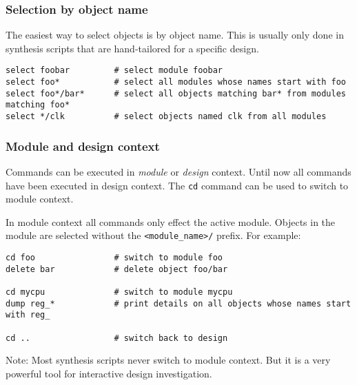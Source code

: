 \subsubsection{Selection by object name}

\begin{frame}[fragile]{\subsubsecname}
The easiest way to select objects is by object name. This is usually only done
in synthesis scripts that are hand-tailored for a specific design.

\bigskip
\begin{lstlisting}[xleftmargin=0.5cm, basicstyle=\ttfamily\fontsize{8pt}{10pt}\selectfont, language=ys]
select foobar         # select module foobar
select foo*           # select all modules whose names start with foo
select foo*/bar*      # select all objects matching bar* from modules matching foo*
select */clk          # select objects named clk from all modules
\end{lstlisting}
\end{frame}

\subsubsection{Module and design context}

\begin{frame}[fragile]{\subsubsecname}
Commands can be executed in {\it module\/} or {\it design\/} context. Until now all
commands have been executed in design context. The {\tt cd} command can be used
to switch to module context.

\bigskip
In module context all commands only effect the active module. Objects in the module
are selected without the {\tt <module\_name>/} prefix. For example:

\bigskip
\begin{lstlisting}[xleftmargin=0.5cm, basicstyle=\ttfamily\fontsize{8pt}{10pt}\selectfont, language=ys]
cd foo                # switch to module foo
delete bar            # delete object foo/bar

cd mycpu              # switch to module mycpu
dump reg_*            # print details on all objects whose names start with reg_

cd ..                 # switch back to design
\end{lstlisting}

\bigskip
Note: Most synthesis scripts never switch to module context. But it is a very powerful
tool for interactive design investigation.
\end{frame}

